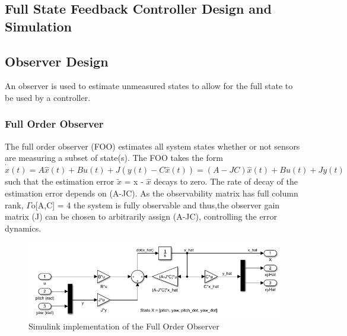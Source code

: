 \documentclass[11pt]{article}
\begin{document}
\subsection{Full State Feedback Controller Design and Simulation}

\subsection{Observer Design}
An observer is used to estimate unmeasured states to allow for the full state to be used by a controller.

\subsubsection{Full Order Observer}
The full order observer (FOO) estimates all system states whether or not sensors are measuring a subset of state(s).
The FOO takes the form
\begin{equation*}
    \dot{\hat{x}}(t) = A\hat{x}(t) + Bu(t) + J(y(t) - C\hat{x}(t)) = (A - J C)\hat{x}(t) + Bu(t) + Jy(t)
\end{equation*}
such that the estimation error $\tilde{x}$ = x - $\hat{x}$ decays to zero. The rate of decay of the estimation error depends on (A-JC). As the observability matrix has full column rank, $\Gamma$o[A,C] = 4 the system is fully observable and thus,the observer gain matrix (J) can be chosen to arbitrarily assign (A-JC), controlling the error dynamics.

\begin{figure}[H]
    \centering
    \includegraphics[width=15cm]{plots/Full-Order-Observer.PNG}
    \caption{Simulink implementation of the Full Order Observer}
    \label{fig:W4_FOO}
\end{figure}
\end{document}
